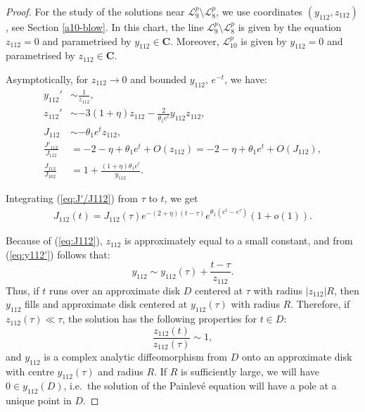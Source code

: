  \begin{proof}
For the study of the solutions near $\mathcal{L}_9^p\setminus\mathcal{L}_8^p$, we use coordinates $(y_{112},z_{112})$, see Section \ref{a10-blow}.
In this chart, the line $\mathcal{L}_9^p\setminus\mathcal{L}_8^p$ is given by the equation $z_{112}=0$ and parametrised by $y_{112}\in\mathbf{C}$.
Moreover, $\mathcal{L}_{10}^p$ is given by $y_{112}=0$ and parametrised by $z_{112}\in\mathbf{C}$.
 
Asymptotically, for $z_{112}\to0$ and bounded $y_{112}$, $e^{-t}$, we have:
\begin{subequations}
\begin{align}
y_{112}' &\sim\frac{1}{z_{112}},\label{eq:y112'}
\\
z_{112}' &\sim-3(1+\eta)z_{112}-\frac{2}{\theta_1 e^t}y_{112}z_{112},\label{eq:z112'}
\\
J_{112} &\sim-\theta_1 e^t z_{112},\label{eq:J112}
\\
\frac{J'_{112}}{J_{112}} & = -2-\eta+\theta_1e^t+O(z_{112})=-2-\eta+\theta_1e^t+O(J_{112}),\label{eq:J'/J112}
\\
\frac{J_{112}}{J_{102}} & = 1+\frac{(1+\eta)\theta_1 e^t}{y_{112}}.\label{eq:J112/J102}
\end{align}
\end{subequations}

Integrating (\ref{eq:J'/J112}) from $\tau$ to $t$, we get
\begin{gather*}
J_{112}(t)=J_{112}(\tau)e^{-(2+\eta)(t-\tau)}e^{\theta_1(e^t-e^{\tau})}(1+o(1)).
\end{gather*}

Because of (\ref{eq:J112}), $z_{112}$ is approximately equal to a small constant, and from (\ref{eq:y112'}) follows that:
$$
y_{112}\sim y_{112}(\tau)+\frac{t-\tau}{z_{112}}.
$$
Thus, if $t$ runs over an approximate disk $D$ centered at $\tau$ with radius $|z_{112}|R$, then $y_{112}$ fills and approximate disk centered at $y_{112}(\tau)$ with radius $R$.
Therefore, if $z_{112}(\tau)\ll\tau$, the solution has the following properties for $t\in D$:
$$
\frac{z_{112}(t)}{z_{112}(\tau)}\sim1,
 $$ 
 and $y_{112}$ is a complex analytic diffeomorphism from $D$ onto an approximate disk with centre $y_{112}(\tau)$ and radius $R$.
 If $R$ is sufficiently large, we will have $0\in y_{112}(D)$, i.e.~the solution of the Painlev\'e equation will have a pole at a unique point in $D$.
 

\end{proof}
